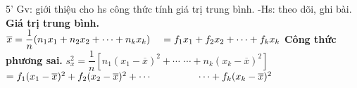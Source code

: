 \begin{bang}{3}
\gvhsnd
{5'}
{Gv: giới thiệu cho hs công thức tính giá trị trung bình.\newline
-Hs: theo dõi, ghi bài.\newline }
{{\bf *Giá trị trung bình.}\newline
 $\overline{x}=\dfrac{1}{n}(n_1x_1+n_2x_2+\cdots +n_kx_k) \newline \phantom{x1}
 =f_1x_1+f_2x_2+\cdots +f_kx_k$ 
}
{{\bf *Công thức phương sai.}
\newline
 $s^2_x=\dfrac{1}{n}\left[n_1(x_1-\overline{x})^2+\cdots \right.$ \newline \hspace*{1.6 cm}  
$\left.  \cdots +n_k(x_k-\overline{x})^2\right]$  \newline
 $=f_1(x_1-\overline{x})^2+f_2(x_2-\overline{x})^2+\cdots \newline \hspace*{1.6 cm}  
\cdots +f_k(x_k-\overline{x})^2$}
\end{bang}